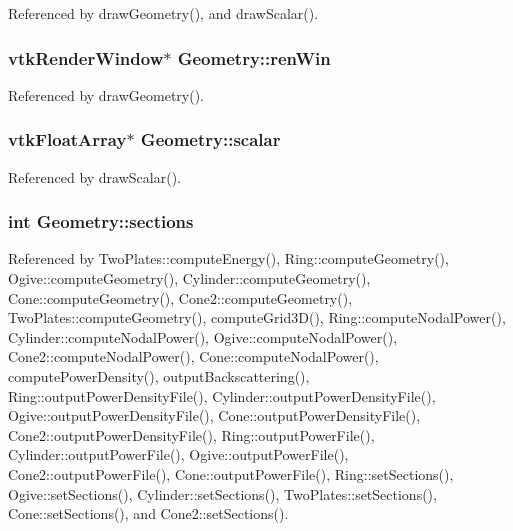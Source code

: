 Referenced by draw\-Geometry(), and draw\-Scalar().

\hypertarget{classGeometry_a22b4feeba28c4834bc9ac42e838cb7bb}{
\subsubsection[{ren\-Win}]{\setlength{\rightskip}{0pt plus 5cm}vtk\-Render\-Window$\ast$ Geometry\-::ren\-Win\hspace{0.3cm}{\ttfamily [protected]}}}\label{classGeometry_a22b4feeba28c4834bc9ac42e838cb7bb}


Referenced by draw\-Geometry().

\hypertarget{classGeometry_a49e66de69aa22b88759e903e1ae06c9b}{
\subsubsection[{scalar}]{\setlength{\rightskip}{0pt plus 5cm}vtk\-Float\-Array$\ast$ Geometry\-::scalar\hspace{0.3cm}{\ttfamily [protected]}}}\label{classGeometry_a49e66de69aa22b88759e903e1ae06c9b}


Referenced by draw\-Scalar().

\hypertarget{classGeometry_a0efc4bf9252077abca96c1c198eefa33}{
\subsubsection[{sections}]{\setlength{\rightskip}{0pt plus 5cm}int Geometry\-::sections\hspace{0.3cm}{\ttfamily [protected]}}}\label{classGeometry_a0efc4bf9252077abca96c1c198eefa33}


Referenced by Two\-Plates\-::compute\-Energy(), Ring\-::compute\-Geometry(), Ogive\-::compute\-Geometry(), Cylinder\-::compute\-Geometry(), Cone\-::compute\-Geometry(), Cone2\-::compute\-Geometry(), Two\-Plates\-::compute\-Geometry(), compute\-Grid3\-D(), Ring\-::compute\-Nodal\-Power(), Cylinder\-::compute\-Nodal\-Power(), Ogive\-::compute\-Nodal\-Power(), Cone2\-::compute\-Nodal\-Power(), Cone\-::compute\-Nodal\-Power(), compute\-Power\-Density(), output\-Backscattering(), Ring\-::output\-Power\-Density\-File(), Cylinder\-::output\-Power\-Density\-File(), Ogive\-::output\-Power\-Density\-File(), Cone\-::output\-Power\-Density\-File(), Cone2\-::output\-Power\-Density\-File(), Ring\-::output\-Power\-File(), Cylinder\-::output\-Power\-File(), Ogive\-::output\-Power\-File(), Cone2\-::output\-Power\-File(), Cone\-::output\-Power\-File(), Ring\-::set\-Sections(), Ogive\-::set\-Sections(), Cylinder\-::set\-Sections(), Two\-Plates\-::set\-Sections(), Cone\-::set\-Sections(), and Cone2\-::set\-Sections().

